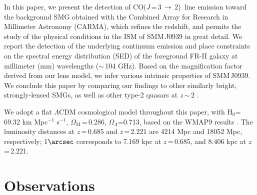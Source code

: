 \documentclass[iop]{emulateapj}
\newcommand{\CO}{\mbox{CO($J$\,=\,3\,$\rightarrow$\,2) }}
\newcommand{\pmOne}{\mbox{$^{-1}$}}
\begin{document}
In this paper, we present the detection of \CO line emission toward the background SMG obtained with the Combined
Array for Research in Millimeter Astronomy (CARMA), which refines the redshift, and permits the study of the physical conditions in the ISM of SMM\,J0939 in great detail. We report the detection of the underlying continuum emission and place constraints on the spectral energy distribution (SED) of the foreground FR-II galaxy at millimeter (mm) wavelengths ($\sim$\,104 GHz). Based on the magnification factor derived from our lens model, we infer various intrinsic properties of SMM\,J0939. We 
conclude this paper by comparing our findings to other similarly bright, strongly-lensed SMGs, as well as other type-2 quasars at $z$\,$\sim$\,2 .

We adopt a flat $\Lambda$CDM cosmological model throughout this paper, with H$_0$= 69.32 km\,\,Mpc\pmOne\,\,s\pmOne, $\Omega_\textrm{M}$\,=\,0.286, $\Omega_\Lambda$=0.713, based on the WMAP9 results \citep{Hinshaw13a}.
The luminosity distances at $z$\,=\,0.685 and $z$\,=\,2.221 are 4214 Mpc and 18052 Mpc, respectively; 1$\arcsec$
corresponds to 7.169 kpc at $z$\,=\,0.685, and 8.406 kpc at $z$\,=\,2.221.

\section{Observations}\label{sec:obs}
\end{document}
